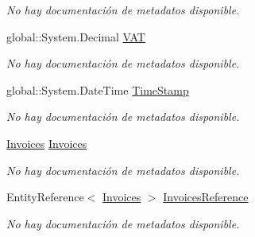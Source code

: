 \begin{DoxyCompactItemize}
\begin{DoxyCompactList}\small\item\em No hay documentación de metadatos disponible. \end{DoxyCompactList}\item 
global\-::\-System.\-Decimal \hyperlink{class_microsoft_1_1_samples_1_1_kinect_1_1_basic_interactions_1_1_invoice_details_a83bdeda4946c9a7d995b74a5cc964f85}{V\-A\-T}
\begin{DoxyCompactList}\small\item\em No hay documentación de metadatos disponible. \end{DoxyCompactList}\item 
global\-::\-System.\-Date\-Time \hyperlink{class_microsoft_1_1_samples_1_1_kinect_1_1_basic_interactions_1_1_invoice_details_a2bc0ccef382ca15dd09ae5260b32a17e}{Time\-Stamp}
\begin{DoxyCompactList}\small\item\em No hay documentación de metadatos disponible. \end{DoxyCompactList}\item 
\hyperlink{class_microsoft_1_1_samples_1_1_kinect_1_1_basic_interactions_1_1_invoices}{Invoices} \hyperlink{class_microsoft_1_1_samples_1_1_kinect_1_1_basic_interactions_1_1_invoice_details_aeecaffa3108ea9eeeda4160aa77e295e}{Invoices}
\begin{DoxyCompactList}\small\item\em No hay documentación de metadatos disponible. \end{DoxyCompactList}\item 
Entity\-Reference$<$ \hyperlink{class_microsoft_1_1_samples_1_1_kinect_1_1_basic_interactions_1_1_invoices}{Invoices} $>$ \hyperlink{class_microsoft_1_1_samples_1_1_kinect_1_1_basic_interactions_1_1_invoice_details_a185be33fb5bb524b488f3d0c0f38f20a}{Invoices\-Reference}
\begin{DoxyCompactList}\small\item\em No hay documentación de metadatos disponible. \end{DoxyCompactList}\end{DoxyCompactItemize}


